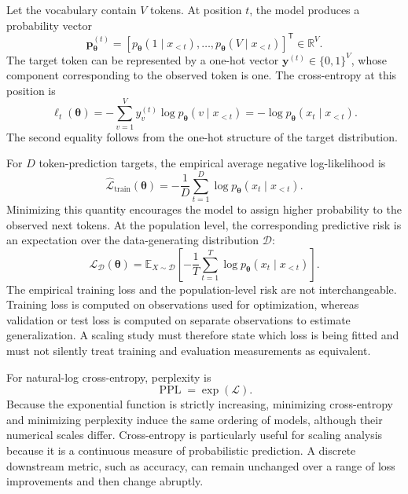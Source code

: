 Let the vocabulary contain \(V\) tokens. At position \(t\), the model produces
a probability vector
\[
    \mathbf{p}^{(t)}_{\boldsymbol{\theta}}
    =
    \left[
    p_{\boldsymbol{\theta}}(1\mid x_{<t}),\ldots,
    p_{\boldsymbol{\theta}}(V\mid x_{<t})
    \right]^{\mathsf T}
    \in\mathbb{R}^{V}.
\]
The target token can be represented by a one-hot vector
\(\mathbf{y}^{(t)}\in\{0,1\}^{V}\), whose component corresponding to the
observed token is one. The cross-entropy at this position is
\begin{equation}
    \ell_t(\boldsymbol{\theta})
    =
    -\sum_{v=1}^{V}
    y_v^{(t)}
    \log p_{\boldsymbol{\theta}}(v\mid x_{<t})
    =
    -\log p_{\boldsymbol{\theta}}(x_t\mid x_{<t}).
    \label{eq:scaling-token-cross-entropy}
\end{equation}
The second equality follows from the one-hot structure of the target
distribution.

For \(D\) token-prediction targets, the empirical average negative
log-likelihood is
\begin{equation}
    \widehat{\mathcal{L}}_{\mathrm{train}}
    (\boldsymbol{\theta})
    =
    -\frac{1}{D}
    \sum_{t=1}^{D}
    \log p_{\boldsymbol{\theta}}(x_t\mid x_{<t}).
    \label{eq:scaling-empirical-loss}
\end{equation}
Minimizing this quantity encourages the model to assign higher probability
to the observed next tokens. At the population level, the corresponding
predictive risk is an expectation over the data-generating distribution
\(\mathcal{D}\):
\begin{equation}
    \mathcal{L}_{\mathcal{D}}(\boldsymbol{\theta})
    =
    \mathbb{E}_{X\sim\mathcal{D}}
    \left[
    -\frac{1}{T}
    \sum_{t=1}^{T}
    \log p_{\boldsymbol{\theta}}(x_t\mid x_{<t})
    \right].
    \label{eq:scaling-population-loss}
\end{equation}
The empirical training loss and the population-level risk are not
interchangeable. Training loss is computed on observations used for
optimization, whereas validation or test loss is computed on separate
observations to estimate generalization. A scaling study must therefore state
which loss is being fitted and must not silently treat training and evaluation
measurements as equivalent.

For natural-log cross-entropy, perplexity is
\begin{equation}
    \operatorname{PPL}
    =
    \exp(\mathcal{L}).
    \label{eq:scaling-perplexity}
\end{equation}
Because the exponential function is strictly increasing, minimizing
cross-entropy and minimizing perplexity induce the same ordering of models,
although their numerical scales differ. Cross-entropy is particularly useful
for scaling analysis because it is a continuous measure of probabilistic
prediction. A discrete downstream metric, such as accuracy, can remain
unchanged over a range of loss improvements and then change abruptly.

